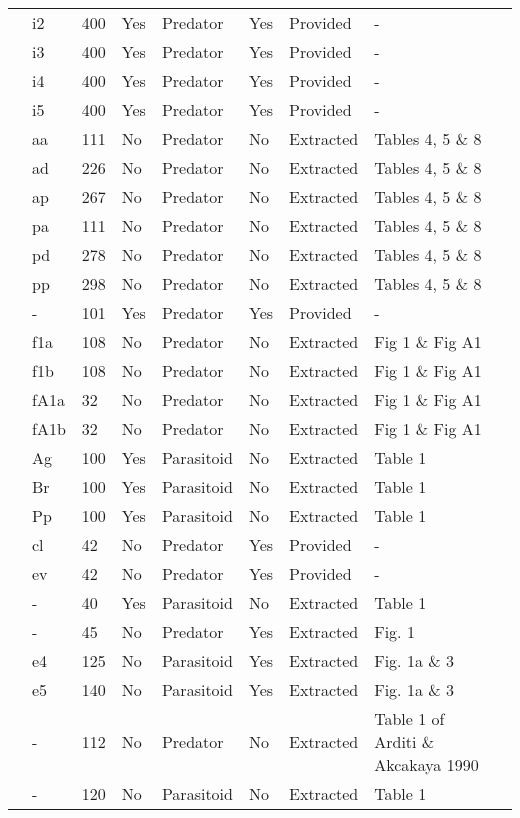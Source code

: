 \begin{longtable}{lllllllll}
\citet{Elliott:2005aa}&i2&400&Yes&Predator&Yes&Provided&-&\tabularnewline
\citet{Elliott:2005aa}&i3&400&Yes&Predator&Yes&Provided&-&\tabularnewline
\citet{Elliott:2005aa}&i4&400&Yes&Predator&Yes&Provided&-&\tabularnewline
\citet{Elliott:2005aa}&i5&400&Yes&Predator&Yes&Provided&-&\tabularnewline
\citet{Eveleigh:1982aa}&aa&111&No&Predator&No&Extracted&Tables 4, 5 \& 8&\citet{Novak:2020aa}\tabularnewline
\citet{Eveleigh:1982aa}&ad&226&No&Predator&No&Extracted&Tables 4, 5 \& 8&\citet{Novak:2020aa}\tabularnewline
\citet{Eveleigh:1982aa}&ap&267&No&Predator&No&Extracted&Tables 4, 5 \& 8&\citet{Novak:2020aa}\tabularnewline
\citet{Eveleigh:1982aa}&pa&111&No&Predator&No&Extracted&Tables 4, 5 \& 8&\citet{Novak:2020aa}\tabularnewline
\citet{Eveleigh:1982aa}&pd&278&No&Predator&No&Extracted&Tables 4, 5 \& 8&\citet{Novak:2020aa}\tabularnewline
\citet{Eveleigh:1982aa}&pp&298&No&Predator&No&Extracted&Tables 4, 5 \& 8&\citet{Novak:2020aa}\tabularnewline
\citet{Fussmann:2005aa}&-&101&Yes&Predator&Yes&Provided&-&\citet{Fussmann:2020aa}\tabularnewline
\citet{Griffen:2007aa}&f1a&108&No&Predator&No&Extracted&Fig 1 \& Fig A1&\citet{Novak:2020aa}\tabularnewline
\citet{Griffen:2007aa}&f1b&108&No&Predator&No&Extracted&Fig 1 \& Fig A1&\citet{Novak:2020aa}\tabularnewline
\citet{Griffen:2007aa}&fA1a&32&No&Predator&No&Extracted&Fig 1 \& Fig A1&\citet{Novak:2020aa}\tabularnewline
\citet{Griffen:2007aa}&fA1b&32&No&Predator&No&Extracted&Fig 1 \& Fig A1&\citet{Novak:2020aa}\tabularnewline
\citet{Hassan:1976aa}&Ag&100&Yes&Parasitoid&No&Extracted&Table 1&\citet{Novak:2020aa}\tabularnewline
\citet{Hassan:1976aa}&Br&100&Yes&Parasitoid&No&Extracted&Table 1&\citet{Novak:2020aa}\tabularnewline
\citet{Hassan:1976aa}&Pp&100&Yes&Parasitoid&No&Extracted&Table 1&\citet{Novak:2020aa}\tabularnewline
\citet{Hossie:2016aa}&cl&42&No&Predator&Yes&Provided&-&\citet{Hossie:2020aa}\tabularnewline
\citet{Hossie:2016aa}&ev&42&No&Predator&Yes&Provided&-&\citet{Hossie:2020aa}\tabularnewline
\citet{Huffaker:1982aa}&-&40&Yes&Parasitoid&No&Extracted&Table 1&\citet{Novak:2020aa}\tabularnewline
\citet{Johnson:2006aa}&-&45&No&Predator&Yes&Extracted&Fig. 1&\citet{Novak:2020aa}\tabularnewline
\citet{Jones:1988aa, Jones:1986aa}&e4&125&No&Parasitoid&Yes&Extracted&Fig. 1a \& 3&\citet{Novak:2020aa}\tabularnewline
\citet{Jones:1988aa, Jones:1986aa}&e5&140&No&Parasitoid&Yes&Extracted&Fig. 1a \& 3&\citet{Novak:2020aa}\tabularnewline
\citet{Katz:1985ai}&-&112&No&Predator&No&Extracted&Table 1 of Arditi \& Akcakaya 1990&\citet{Arditi:1990sp}\tabularnewline
\citet{Kfir:1983aa}&-&120&No&Parasitoid&No&Extracted&Table 1&\citet{Novak:2020aa}\tabularnewline

\end{longtable}
